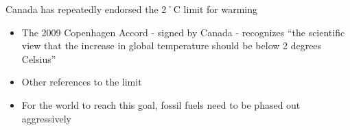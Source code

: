 Canada has repeatedly endorsed the 2˚C limit for warming
\begin{itemize}
	\item The 2009 Copenhagen Accord - signed by Canada - recognizes ``the scientific view that the increase in global temperature should be below 2 degrees Celsius''
	\item \textsf{Other references to the limit}
	\item For the world to reach this goal, fossil fuels need to be phased out aggressively
\end{itemize}
	
